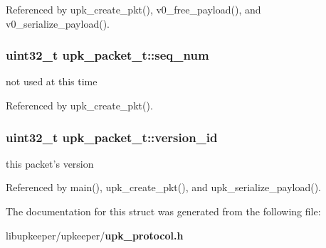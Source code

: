 Referenced by upk\_\-create\_\-pkt(), v0\_\-free\_\-payload(), and v0\_\-serialize\_\-payload().

\subsubsection[{seq\_\-num}]{\setlength{\rightskip}{0pt plus 5cm}uint32\_\-t {\bf upk\_\-packet\_\-t::seq\_\-num}}\label{structupk__packet__t_a80fc00b3c474ce2364b738c0cc2eefa2}
not used at this time 

Referenced by upk\_\-create\_\-pkt().

\subsubsection[{version\_\-id}]{\setlength{\rightskip}{0pt plus 5cm}uint32\_\-t {\bf upk\_\-packet\_\-t::version\_\-id}}\label{structupk__packet__t_a7af5bfe76852db8538b31fe06418c9d4}
this packet's version 

Referenced by main(), upk\_\-create\_\-pkt(), and upk\_\-serialize\_\-payload().



The documentation for this struct was generated from the following file:\begin{DoxyCompactItemize}
\item 
libupkeeper/upkeeper/{\bf upk\_\-protocol.h}\end{DoxyCompactItemize}
